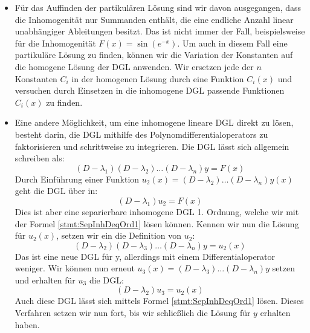 \begin{itemize}
    \item Für das Auffinden der partikulären Lösung sind wir davon ausgegangen, dass die Inhomogenität nur Summanden enthält, die eine endliche Anzahl linear unabhängiger Ableitungen besitzt. Das ist nicht immer der Fall, beispielsweise für die Inhomogenität $F(x) = \sin(e^{-x})$. Um auch in diesem Fall eine partikuläre Lösung zu finden, können wir die Variation der Konstanten auf die homogene Lösung der DGL anwenden. Wir ersetzen jede der $n$ Konstanten $C_i$ in der homogenen Lösung durch eine Funktion $C_i(x)$ und versuchen durch Einsetzen in die inhomogene DGL passende Funktionen $C_i(x)$ zu finden.
    \item Eine andere Möglichkeit, um eine inhomogene lineare DGL direkt zu lösen, besteht darin, die DGL mithilfe des Polynomdifferentialoperators zu faktorisieren und schrittweise zu integrieren. Die DGL lässt sich allgemein schreiben als:
    $$
        (D-\lambda_1) (D-\lambda_2) \dots (D-\lambda_n) y = F(x)
    $$
    Durch Einführung einer Funktion $u_2(x) = (D-\lambda_2) \dots (D-\lambda_n) y(x)$ geht die DGL über in:
    $$
        (D-\lambda_1) u_2 = F(x)
    $$
    Dies ist aber eine separierbare inhomogene DGL 1. Ordnung, welche wir mit der Formel \ref{stmt:SepInhDeqOrd1} lösen können. Kennen wir nun die Lösung für $u_2(x)$, setzen wir ein die Definition von $u_2$:
    $$
        (D-\lambda_2) (D-\lambda_3) \dots (D-\lambda_n) y = u_2(x)
    $$
    Das ist eine neue DGL für y, allerdings mit einem Differentialoperator weniger. Wir können nun erneut $u_3(x) = (D-\lambda_3) \dots (D-\lambda_n) y$ setzen und erhalten für $u_3$ die DGL:
    $$
        (D-\lambda_2) u_3 = u_2(x)
    $$
    Auch diese DGL lässt sich mittels Formel \ref{stmt:SepInhDeqOrd1} lösen. Dieses Verfahren setzen wir nun fort, bis wir schließlich die Lösung für $y$ erhalten haben.
\end{itemize}


